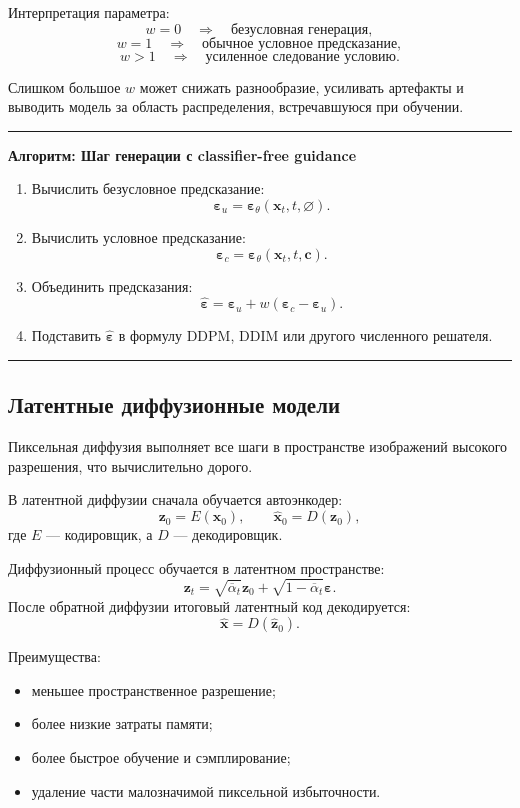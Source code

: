 \documentclass[12pt,a4paper]{article}
\theoremstyle{definition}
\newcommand{\eps}{\varepsilon}
\newcommand{\1}{\mathbf{1}}
\newenvironment{algorithmbox}[1]
{
    \begin{center}
    \begin{minipage}{0.95\textwidth}
    \hrule
    \medskip
    \textbf{Алгоритм: #1}
    \begin{enumerate}[leftmargin=*,label=\arabic*.]
}
{
    \end{enumerate}
    \medskip
    \hrule
    \end{minipage}
    \end{center}
}
\begin{document}
Интерпретация параметра:
\[
    w=0
    \quad\Rightarrow\quad
    \text{безусловная генерация},
\]
\[
    w=1
    \quad\Rightarrow\quad
    \text{обычное условное предсказание},
\]
\[
    w>1
    \quad\Rightarrow\quad
    \text{усиленное следование условию}.
\]

Слишком большое $w$ может снижать разнообразие, усиливать артефакты и
выводить модель за область распределения, встречавшуюся при обучении.

\begin{algorithmbox}{Шаг генерации с classifier-free guidance}
    \item Вычислить безусловное предсказание:
    \[
        \bm{\eps}_u
        =
        \bm{\eps}_\theta(\bm{x}_t,t,\varnothing).
    \]
    \item Вычислить условное предсказание:
    \[
        \bm{\eps}_c
        =
        \bm{\eps}_\theta(\bm{x}_t,t,\bm{c}).
    \]
    \item Объединить предсказания:
    \[
        \widehat{\bm{\eps}}
        =
        \bm{\eps}_u+w(\bm{\eps}_c-\bm{\eps}_u).
    \]
    \item Подставить $\widehat{\bm{\eps}}$ в формулу DDPM, DDIM или
    другого численного решателя.
\end{algorithmbox}

\subsection{Латентные диффузионные модели}

Пиксельная диффузия выполняет все шаги в пространстве изображений
высокого разрешения, что вычислительно дорого.

В латентной диффузии сначала обучается автоэнкодер:
\[
    \bm{z}_0=E(\bm{x}_0),
    \qquad
    \widehat{\bm{x}}_0=D(\bm{z}_0),
\]
где $E$ --- кодировщик, а $D$ --- декодировщик.

Диффузионный процесс обучается в латентном пространстве:
\[
    \bm{z}_t
    =
    \sqrt{\overline{\alpha}_t}\bm{z}_0
    +
    \sqrt{1-\overline{\alpha}_t}\bm{\eps}.
\]
После обратной диффузии итоговый латентный код декодируется:
\[
    \widehat{\bm{x}}=D(\widehat{\bm{z}}_0).
\]

Преимущества:
\begin{itemize}
    \item меньшее пространственное разрешение;
    \item более низкие затраты памяти;
    \item более быстрое обучение и сэмплирование;
    \item удаление части малозначимой пиксельной избыточности.
\end{itemize}
\end{document}
